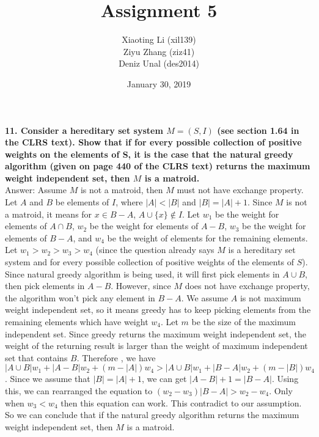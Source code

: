 \documentclass{article}
\title{Assignment 5}
\author{Xiaoting Li (xil139) \\
Ziyu Zhang (ziz41) \\
Deniz Unal (des2014)}
\date{January 30, 2019}
\begin{document}
\maketitle

\noindent
\textbf{11. Consider a hereditary set system $M = (S, I)$ (see section 1.64 in the CLRS text). Show that if for every possible collection of positive weights on the elements of S, it is the case that the natural greedy algorithm (given on page 440 of the CLRS text) returns the maximum weight independent set, then $M$ is a matroid.} \\ \newline
\noindent
Answer:
Assume $M$ is not a matroid, then $M$ must not have exchange property. Let $A$ and $B$ be elements of $I$, where $|A| < |B|$ and $|B| = |A| + 1$. Since $M$ is not a matroid, it means for $x \in B - A$, $A \cup \{x\} \notin I$. Let $w_1$ be the weight for elements of $A \cap B$, $w_2$ be the weight for elements of $A - B$, $w_3$ be the weight for elements of $B - A$, and $w_4$ be the weight of elements for the remaining elements. Let $w_1 > w_2 > w_3 > w_4$ (since the question already says $M$ is a hereditary set system and for every possible collection of positive weights of the elements of $S$). \\ \newline
\noindent
Since natural greedy algorithm is being used, it will first pick elements in $A \cup B$, then pick elements in $A - B$. However, since $M$ does not have exchange property, the algorithm won't pick any element in $B - A$. We assume $A$ is not maximum weight independent set, so it means greedy has to keep picking elements from the remaining elements which have weight $w_4$. Let $m$ be the size of the maximum independent set. Since greedy returns the maximum weight independent set, the weight of the returning result is larger than the weight of maximum independent set that contains $B$. Therefore , we have $|A \cup B|w_1 + |A - B|w_2 + (m - |A|)w_4 > |A \cup B|w_1 + |B - A|w_2 + (m - |B|)w_4$. Since we assume that $|B| = |A| + 1$, we can get $|A - B| + 1 = |B - A|$. Using this, we can rearranged the equation to $(w_2 - w_3)|B - A| > w_2 - w_4$. Only when $w_3 < w_4$ then this equation can work. This contradict to our assumption. So we can conclude that if the natural greedy algorithm returns the maximum weight independent set, then $M$ is a matroid.
\end{document}
